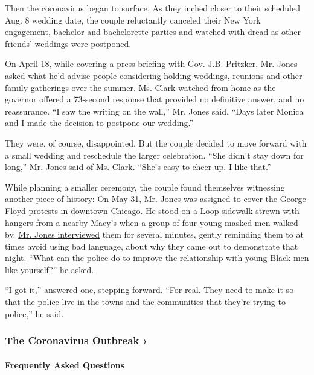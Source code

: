 Then the coronavirus began to surface. As they inched closer to their
scheduled Aug. 8 wedding date, the couple reluctantly canceled their New
York engagement, bachelor and bachelorette parties and watched with
dread as other friends' weddings were postponed.

On April 18, while covering a press briefing with Gov. J.B. Pritzker,
Mr. Jones asked what he'd advise people considering holding weddings,
reunions and other family gatherings over the summer. Ms. Clark watched
from home as the governor offered a 73-second response that provided no
definitive answer, and no reassurance. ``I saw the writing on the
wall,'' Mr. Jones said. ``Days later Monica and I made the decision to
postpone our wedding.''

They were, of course, disappointed. But the couple decided to move
forward with a small wedding and reschedule the larger celebration.
``She didn't stay down for long,'' Mr. Jones said of Ms. Clark. ``She's
easy to cheer up. I like that.''

While planning a smaller ceremony, the couple found themselves
witnessing another piece of history: On May 31, Mr. Jones was assigned
to cover the George Floyd protests in downtown Chicago. He stood on a
Loop sidewalk strewn with hangers from a nearby Macy's when a group of
four young masked men walked by.
\href{https://mail.google.com/mail/u/0/?tab=mm\#search/zulkey/FMfcgxwJXLcWXRSMqHhJjhDJTHWTZLjq?projector=1}{Mr.
Jones interviewed} them for several minutes, gently reminding them to at
times avoid using bad language, about why they came out to demonstrate
that night. ``What can the police do to improve the relationship with
young Black men like yourself?'' he asked.

``I got it,'' answered one, stepping forward. ``For real. They need to
make it so that the police live in the towns and the communities that
they're trying to police,'' he said.

\href{https://www.nytimes3xbfgragh.onion/news-event/coronavirus?action=click\&pgtype=Article\&state=default\&region=MAIN_CONTENT_3\&context=storylines_faq}{}

\hypertarget{the-coronavirus-outbreak-}{%
\subsubsection{The Coronavirus Outbreak
›}\label{the-coronavirus-outbreak-}}

\hypertarget{frequently-asked-questions}{%
\paragraph{Frequently Asked
Questions}\label{frequently-asked-questions}}

